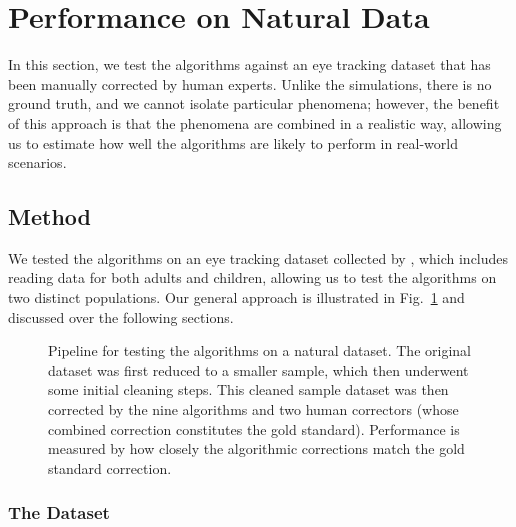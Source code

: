 \documentclass[doc,biblatex]{apa7}
\begin{document}
\section{Performance on Natural Data}

In this section, we test the algorithms against an eye tracking dataset that has been manually corrected by human experts. Unlike the simulations, there is no ground truth, and we cannot isolate particular phenomena; however, the benefit of this approach is that the phenomena are combined in a realistic way, allowing us to estimate how well the algorithms are likely to perform in real-world scenarios.

\subsection{Method}

We tested the algorithms on an eye tracking dataset collected by \textcite{Pescuma:0000}, which includes reading data for both adults and children, allowing us to test the algorithms on two distinct populations. Our general approach is illustrated in Fig.~\ref{fig07} and discussed over the following sections.

	\begin{figure}
	\vspace*{2pt}
	\caption{Pipeline for testing the algorithms on a natural dataset. The original dataset was first reduced to a smaller sample, which then underwent some initial cleaning steps. This cleaned sample dataset was then corrected by the nine algorithms and two human correctors (whose combined correction constitutes the gold standard). Performance is measured by how closely the algorithmic corrections match the gold standard correction.}
	\label{fig07}
	\end{figure}

\subsubsection{The Dataset}
\end{document}
